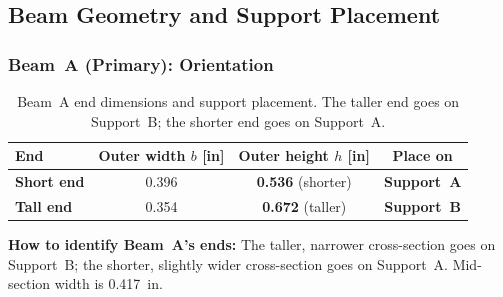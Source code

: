 \documentclass[11pt,letterpaper]{article}
\begin{document}
\subsection{Beam Geometry and Support Placement}
\label{sec:orientation}

\begin{center}
\end{center}

\subsubsection{Beam~A (Primary): Orientation}

\begin{table}[H]
\centering
\caption{Beam~A end dimensions and support placement.
The taller end goes on Support~B; the shorter end goes on Support~A.}
\label{tab:beamA_orient}
\begin{tabular}{lccc}
\toprule
End & Outer width $b$ [in] & Outer height $h$ [in] & Place on \\
\midrule
\textbf{Short end} & 0.396 & \textbf{0.536} (shorter) & \textbf{Support~A} \\
\textbf{Tall end}  & 0.354 & \textbf{0.672} (taller)  & \textbf{Support~B} \\
\bottomrule
\end{tabular}
\end{table}

\noindent\textbf{How to identify Beam~A's ends:}
The taller, narrower cross-section goes on Support~B;
the shorter, slightly wider cross-section goes on Support~A.
Mid-section width is 0.417~in.
\end{document}
